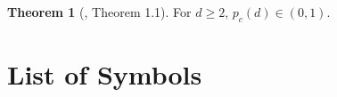 \documentclass[12pt]{article}
\newcommand{\1}{\mathbbm{1}}
\newcommand{\5}{\vspace{0.5cm}}
\theoremstyle{definition}
\newtheorem{thm}{Theorem}[section]
\begin{document}
\begin{thm}[\cite{D-C}, Theorem 1.1]
For $d\geq 2$, $p_c(d)\in (0,1)$.
\end{thm} 


\pagebreak


\section*{List of Symbols}
\end{document}
